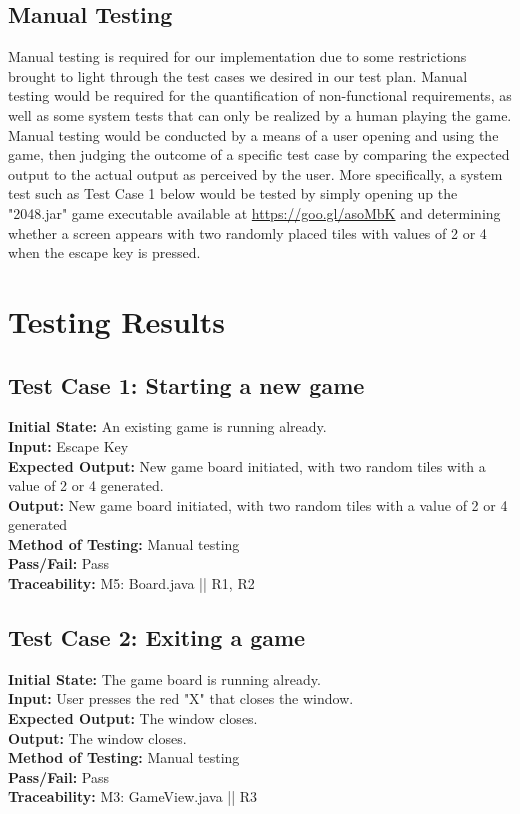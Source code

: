 \documentclass[12pt]{article}
\begin{document}
\subsection{Manual Testing}

Manual testing is required for our implementation due to some restrictions brought to light through the test cases we desired in our test plan. Manual testing would be required for the quantification of non-functional requirements, as well as some system tests that can only be realized by a human playing the game. Manual testing would be conducted by a means of a user opening and using the game, then judging the outcome of a specific test case by comparing the expected output to the actual output as perceived by the user. More specifically, a system test such as Test Case 1 below would be tested by simply opening up the "2048.jar" game executable available at \url{https://goo.gl/asoMbK} and determining whether a screen appears with two randomly placed tiles with values of 2 or 4 when the escape key is pressed. 

\section{Testing Results}

\subsection{Test Case 1: Starting a new game}

\textbf{Initial State:} An existing game is running already. \\
\textbf{Input:} Escape Key\\
\textbf{Expected Output:} New game board initiated, with two random tiles with a value of 2 or 4 generated. \\
\textbf{Output:} New game board initiated, with two random tiles with a value of 2 or 4 generated \\
\textbf{Method of Testing:} Manual testing\\
\textbf{Pass/Fail:} Pass\\
\textbf{Traceability:} M5: Board.java || R1, R2

\subsection{Test Case 2: Exiting a game}

\textbf{Initial State:} The game board is running already.\\
\textbf{Input:} User presses the red "X" that closes the window.\\
\textbf{Expected Output:} The window closes.\\
\textbf{Output:} The window closes. \\
\textbf{Method of Testing:} Manual testing\\
\textbf{Pass/Fail:} Pass\\
\textbf{Traceability:} M3: GameView.java || R3
\end{document}
